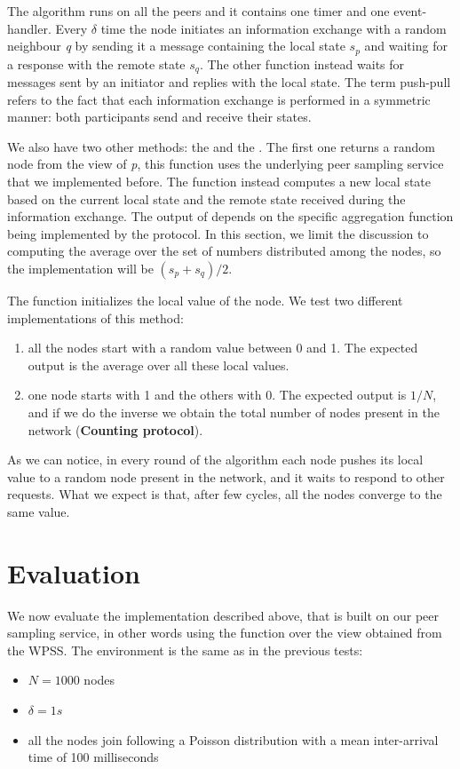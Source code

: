 The algorithm runs on all the peers and it contains one timer and one event-handler. Every $\delta$ time the node initiates an information exchange with a random neighbour \textit{q} by sending it a message containing the local state $s_p$ and waiting for a response with the remote state $s_q$. The other function instead waits for messages sent by an initiator and replies with the local state. The term push-pull refers to the fact that each information exchange is performed in a symmetric manner: both participants send and receive their states.

We also have two other methods: the \getNeighbour and the \update. The first one returns a random node from the view of \textit{p}, this function uses the underlying peer sampling service that we implemented before. The \update function instead computes a new local state based on the current local state and the remote state received during the information exchange. The output of \update depends on the specific aggregation function being implemented by the protocol. In this section, we limit the discussion to computing the average over the set of numbers distributed among the nodes, so the implementation will be $(s_p + s_q) / 2$. 

The \init function initializes the local value of the node. We test two different implementations of this method: 
\begin{enumerate}
	\item all the nodes start with a random value between 0 and 1. The expected output is the average over all these local values.
	\item one node starts with 1 and the others with 0. The expected output is $1/N$, and if we do the inverse we obtain the total number of nodes present in the network (\textbf{Counting protocol}).
\end{enumerate}

As we can notice, in every round of the algorithm each node pushes its local value to a random node present in the network, and it waits to respond to other requests. What we expect is that, after few cycles, all the nodes converge to the same value. 

\section{Evaluation}
\label{sec:evaluation_aggregation}
We now evaluate the implementation described above, that is built on our peer sampling service, in other words using the \getNeighbour function over the view obtained from the \ac{WPSS}. The environment is the same as in the previous tests:
\begin{itemize}
	\item $N = 1000$ nodes
	\item $\delta = 1s$
	\item all the nodes join following a Poisson distribution with a mean inter-arrival time of 100 milliseconds
\end{itemize}

